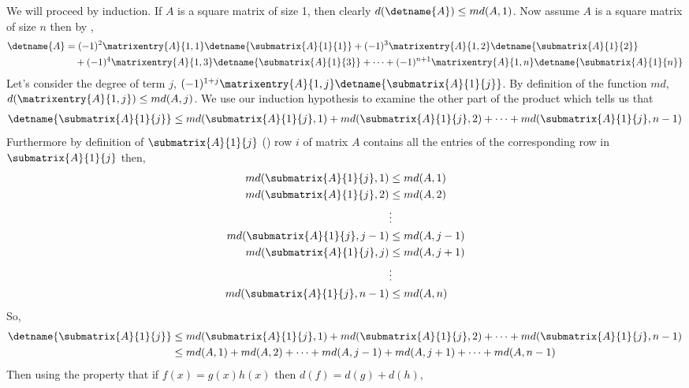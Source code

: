 We will proceed by induction. If $A$ is a square matrix of size 1, then clearly $d(\detname{A}) \leq md(A,1)$. Now assume $A$ is a square matrix of size $n$ then by ,
%
\begin{align*}
\detname{A}&=
(-1)^{2}\matrixentry{A}{1,1}\detname{\submatrix{A}{1}{1}}+
(-1)^{3}\matrixentry{A}{1,2}\detname{\submatrix{A}{1}{2}}\\
&\quad+
(-1)^{4}\matrixentry{A}{1,3}\detname{\submatrix{A}{1}{3}}+
\cdots+
(-1)^{n+1}\matrixentry{A}{1,n}\detname{\submatrix{A}{1}{n}}
\end{align*}
%
Let's consider the degree of term $j$, $(-1)^{1+j}\matrixentry{A}{1,j}\detname{\submatrix{A}{1}{j}}$. By definition of the function $md$, $d(\matrixentry{A}{1,j})\leq md(A,j)$. We use our induction hypothesis to examine the other part of the product which tells us that
%
\begin{align*}
\detname{\submatrix{A}{1}{j}} 
&\leq md(\submatrix{A}{1}{j},1)+md(\submatrix{A}{1}{j},2)+\cdots+md(\submatrix{A}{1}{j},n-1) \\
\end{align*}
%
Furthermore by definition of $\submatrix{A}{1}{j}$ () row $i$ of matrix $A$ contains all the entries of the corresponding row in $\submatrix{A}{1}{j}$ then,  
%
\begin{align*}
md(\submatrix{A}{1}{j},1) &\leq md(A,1) \\
md(\submatrix{A}{1}{j},2) &\leq md(A,2) \\
&\vdots \\
md(\submatrix{A}{1}{j},j-1) &\leq md(A,j-1) \\
md(\submatrix{A}{1}{j},j) &\leq md(A,j+1) \\
&\vdots \\
md(\submatrix{A}{1}{j},n-1) &\leq md(A,n)
\end{align*}
%
So,
%
\begin{align*}
\detname{\submatrix{A}{1}{j}} 
&\leq md(\submatrix{A}{1}{j},1)+md(\submatrix{A}{1}{j},2)+\cdots+md(\submatrix{A}{1}{j},n-1) \\
&\leq md(A,1)+md(A,2)+\cdots+md(A,j-1)+md(A,j+1)+\cdots+md(A,n-1)
\end{align*}
%
Then using the property that if $f(x)=g(x)h(x)$ then $d(f)=d(g)+d(h)$,
